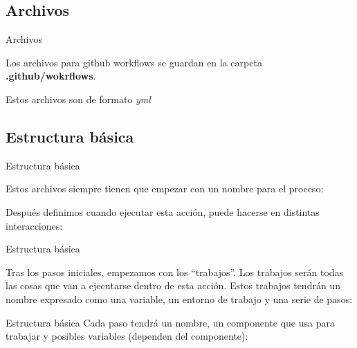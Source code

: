 \documentclass{beamer}
\begin{document}
\subsection{Archivos}
\begin{frame}{Archivos}

    Los archivos para github workflows se guardan en la carpeta \textbf{.github/wokrflows}.

    Estos archivos son de formato \textit{yml}

\end{frame}
\subsection{Estructura básica}
\begin{frame}{Estructura básica}

    Estos archivos siempre tienen que empezar con un nombre para el proceso: \\
    \begin{figure}
        
    \end{figure}

    Después definimos cuando ejecutar esta acción, puede hacerse en distintas interacciones:
    \begin{figure}
        
    \end{figure}
\end{frame}

\begin{frame}{Estructura básica}

    Tras los pasos iniciales, empezamos con los ``trabajos''. Los trabajos serán todas las cosas que van a ejecutarse dentro de esta acción.
    Estos trabajos tendrán un nombre expresado como una variable, un entorno de trabajo y una serie de pasos: \\
    \begin{figure}
        
    \end{figure}
\end{frame}
\begin{frame}{Estructura básica}
    Cada paso tendrá un nombre, un componente que usa para trabajar y posibles variables (dependen del componente):
    \begin{figure}
        
    \end{figure}
\end{frame}
\end{document}
